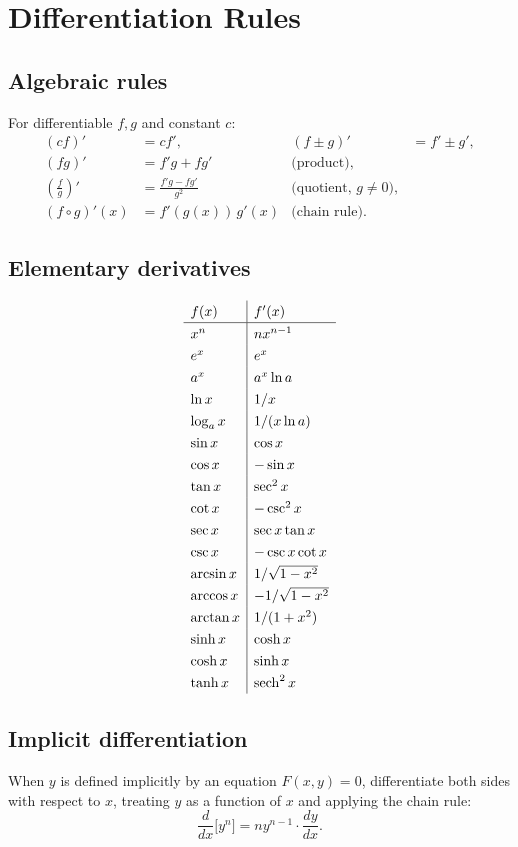 \section{Differentiation Rules}

\subsection{Algebraic rules}
For differentiable $f, g$ and constant $c$:
\[
\begin{aligned}
(cf)' &= c f', & (f \pm g)' &= f' \pm g', \\
(fg)' &= f'g + fg' & \text{(product)}, & \\
\left(\tfrac{f}{g}\right)' &= \frac{f'g - fg'}{g^2} & \text{(quotient, } g \neq 0\text{)}, & \\
(f \circ g)'(x) &= f'(g(x)) \, g'(x) & \text{(chain rule)}.
\end{aligned}
\]

\subsection{Elementary derivatives}
\begin{keybox}
\[
\renewcommand{\arraystretch}{1.3}
\begin{array}{l|l}
f(x) & f'(x) \\\hline
x^n & n x^{n-1} \\
e^x & e^x \\
a^x & a^x \ln a \\
\ln x & 1/x \\
\log_a x & 1/(x \ln a) \\
\sin x & \cos x \\
\cos x & -\sin x \\
\tan x & \sec^2 x \\
\cot x & -\csc^2 x \\
\sec x & \sec x \tan x \\
\csc x & -\csc x \cot x \\
\arcsin x & 1/\sqrt{1 - x^2} \\
\arccos x & -1/\sqrt{1 - x^2} \\
\arctan x & 1/(1 + x^2) \\
\sinh x & \cosh x \\
\cosh x & \sinh x \\
\tanh x & \sech^2 x
\end{array}
\]
\end{keybox}

\subsection{Implicit differentiation}
When $y$ is defined implicitly by an equation $F(x,y) = 0$, differentiate both sides
with respect to $x$, treating $y$ as a function of $x$ and applying the chain rule:
\[ \frac{d}{dx}\bigl[y^n\bigr] = n y^{n-1} \cdot \frac{dy}{dx}. \]

